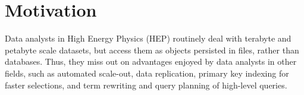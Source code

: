 \documentclass[10pt, conference, compsocconf]{IEEEtran}
\begin{document}









%
%
%

\section{Motivation}

Data analysts in High Energy Physics (HEP) routinely deal with terabyte and petabyte scale datasets, but access them as objects persisted in files, rather than databases. Thus, they miss out on advantages enjoyed by data analysts in other fields, such as automated scale-out, data replication, primary key indexing for faster selections, and term rewriting and query planning of high-level queries.
\end{document}
